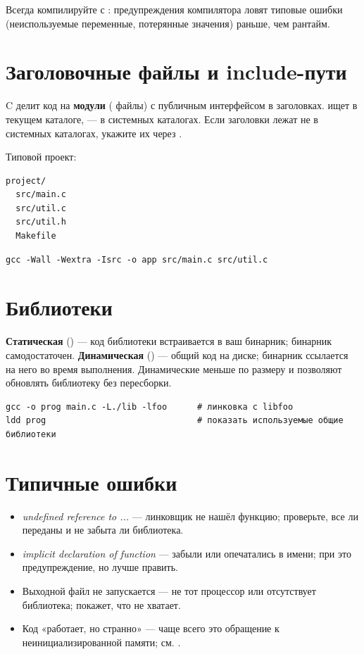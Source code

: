 \begin{tipbox}
Всегда компилируйте с : предупреждения
компилятора ловят типовые ошибки (неиспользуемые переменные,
потерянные значения) раньше, чем рантайм.
\end{tipbox}

\section{Заголовочные файлы и include-пути}

C делит код на \textbf{модули} ( файлы) с
публичным интерфейсом в  заголовках.  ищет в текущем каталоге,  ---
в системных каталогах. Если заголовки лежат не в
системных каталогах, укажите их через .

Типовой проект:
\begin{verbatim}
project/
  src/main.c
  src/util.c
  src/util.h
  Makefile
\end{verbatim}

\begin{verbatim}
gcc -Wall -Wextra -Isrc -o app src/main.c src/util.c
\end{verbatim}

\section{Библиотеки}

\textbf{Статическая} () --- код библиотеки
встраивается в ваш бинарник; бинарник самодостаточен.
\textbf{Динамическая} () --- общий код
на диске; бинарник ссылается на него во время выполнения.
Динамические меньше по размеру и позволяют обновлять
библиотеку без пересборки.

\begin{verbatim}
gcc -o prog main.c -L./lib -lfoo      # линковка с libfoo
ldd prog                              # показать используемые общие библиотеки
\end{verbatim}

\section{Типичные ошибки}
\begin{itemize}
  \item \emph{undefined reference to ...} --- линковщик
    не нашёл функцию; проверьте, все ли 
    переданы и не забыта ли библиотека.
  \item \emph{implicit declaration of function} --- забыли
     или опечатались в имени; при
     это предупреждение, но лучше править.
  \item Выходной файл не запускается --- не тот процессор
    или отсутствует библиотека;  покажет, что
    не хватает.
  \item Код «работает, но странно» --- чаще всего это
    обращение к неинициализированной памяти; см.
    .
\end{itemize}

